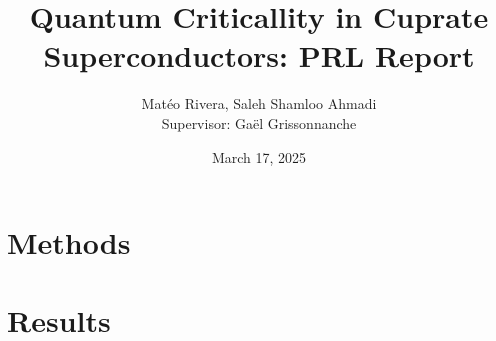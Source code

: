 \documentclass[12pt]{article}
\title{Quantum Criticallity in Cuprate Superconductors: PRL Report}
\author{Matéo Rivera, Saleh Shamloo Ahmadi\\Supervisor: Gaël Grissonnanche}
\date{March 17, 2025}
\begin{document}
\maketitle







\section{Methods}




\section{Results}



\end{document}
